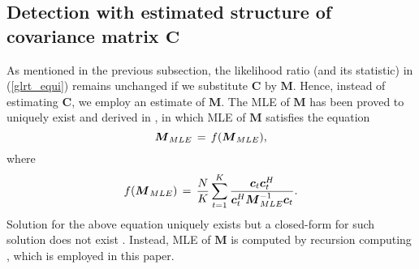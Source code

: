 \subsection{Detection with estimated structure of covariance matrix $\boldsymbol{C}$}
As mentioned in the previous subsection,
the likelihood ratio (and its statistic) in (\ref{glrt_equi})
remains unchanged if we substitute
$\boldsymbol{C}$ by $\boldsymbol{M}$.
Hence, instead of estimating $\boldsymbol{C}$, we employ
an estimate of $\boldsymbol{M}$.
The MLE of $\boldsymbol{M}$ %
has been proved to uniquely exist and derived in
\cite{Pascal08}, in which
MLE of $\boldsymbol{M}$
satisfies the equation
\begin{equation}\label{MLE_compoundG}
     \boldsymbol{M}_{MLE} \thinspace = \thinspace f(\boldsymbol{M}_{MLE}),
\end{equation}
where %
\begin{equation}\label{MLE_func}
  f(\boldsymbol{M}_{MLE}) \thinspace = \thinspace
  \frac{N}{K} \sum_{t=1}^{K} \frac{ \boldsymbol{c}_t \boldsymbol{c}_t^H}
                                  {\boldsymbol{c}_t^H \boldsymbol{M}_{MLE}^{-1}\boldsymbol{c}_t}.
  \end{equation}
  Solution for the above equation uniquely exists but
a closed-form for such solution does not exist \cite{Pascal08}.
Instead, MLE of $\boldsymbol{M}$ is computed by recursion computing \cite{Pascal08},
which
is employed in this paper.

